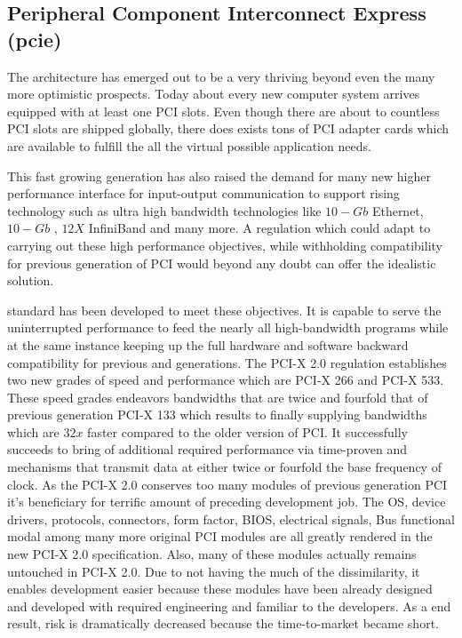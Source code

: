 \subsection{Peripheral Component Interconnect Express (\gls{pcie})}
The  architecture has emerged out to be a very thriving beyond even the many more optimistic prospects. Today about every new computer system arrives equipped with at least one PCI slots. Even though there are about to countless PCI slots are shipped globally, there does exists tons of PCI adapter cards which are available to fulfill the all the virtual possible application needs.

This fast growing generation has also raised the demand for many new higher performance interface for input-output communication to support rising technology such as ultra high bandwidth technologies like $ 10-Gb $ Ethernet, $ 10-Gb $ , $ 12X $ InfiniBand and many more. A regulation which could adapt to carrying out these high performance objectives, while withholding compatibility for previous generation of PCI would beyond any doubt can offer the idealistic solution.

 standard has been developed to meet these objectives. It is capable to serve the uninterrupted performance to feed the nearly all high-bandwidth programs while at the same instance keeping up the full hardware and software backward compatibility for previous  and  generations. The PCI-X 2.0 regulation establishes two new grades of speed and performance which are PCI-X 266 and PCI-X 533. These speed grades endeavors bandwidths that are twice and fourfold that of previous generation PCI-X 133 which results to finally supplying bandwidths which are $ 32x $ faster compared to the older version of PCI. It successfully succeeds to bring of additional required performance via time-proven  and  mechanisms that transmit data at either twice or fourfold the base frequency of clock. As the PCI-X 2.0 conserves too many modules of previous generation PCI it's beneficiary for terrific amount of preceding development job. The OS, device drivers, protocols, connectors, form factor, BIOS, electrical signals, Bus functional modal among many more original PCI modules are all greatly rendered in the new PCI-X 2.0 specification.
Also, many of these modules actually remains untouched in PCI-X 2.0. Due to not having the much of the dissimilarity, it enables development easier because these modules have been already designed and developed with required engineering and familiar to the developers. As a end result, risk is dramatically decreased because the time-to-market became short.

